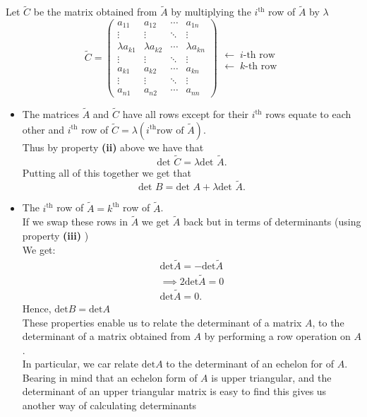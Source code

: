 \documentclass{report}
\begin{document}
\begin{enumerate}[label=(\roman*)]
{                  Let $\tilde{C}$ be the matrix obtained from $\tilde{A}$ by multiplying the $i^{\text{th}}$ row of $\tilde{A}$ by $\lambda$  
\[
\tilde{C} =
\begin{pmatrix}
  a_{11} & a_{12} & \cdots & a_{1n} \\
  \vdots & \vdots & \ddots & \vdots \\
  \lambda a_{k1} & \lambda a_{k2} & \cdots & \lambda a_{kn} \\
  \vdots & \vdots & \ddots & \vdots \\
  a_{k1} & a_{k2} & \cdots & a_{kn} \\
  \vdots & \vdots & \ddots & \vdots \\
  a_{n1} & a_{n2} & \cdots & a_{nn}
\end{pmatrix}
\!
\begin{array}{l}
 \\[1.5ex]
 \leftarrow\; \text{$i$-th row }  \\[3.5ex]
 \leftarrow\; \text{$k$-th row}
\end{array}
\]
\begin{itemize}
        \item The matrices $\tilde{A}$ and $\tilde{C}$ have all rows except for their $i^{\text{th}}$  rows equate to each other and $i^{\text{th}}$  row of $\tilde{C} = \lambda \left( i^{\text{th}} \text{row of } \tilde{A} \right) $.\\
                Thus by property \textbf{(ii)} above we have that
                \[
                \text{det } \tilde{C} = \lambda\text{det } \tilde{A} 
                .\] Putting all of this together  we get that 
                \[
                \text{det } B = \text{det } A + \lambda \text{det }  \tilde{A}
                .\] 
        \item The $i^{\text{th}}$  row of $\tilde{A}= k^{\text{th}}$ row of $\tilde{A}$.\\
                If we swap these rows in $\tilde{A}$ we get $\tilde{A} $ back but in terms of determinants (using property \textbf{(iii)} ) \\
                We get:\\
                \begin{align*}
                        \text{det} \tilde{A} = - \text{det} \tilde{A}\\
                        \implies 2 \text{det} \tilde{A}=0\\
                        \text{det} \tilde{A}=0
                .\end{align*}
                Hence,  $\text{det}  B = \text{det} A$\\
                These properties enable us to relate the determinant of a matrix $A$, to the determinant of a matrix obtained from $A$ by performing a row operation on $A$.\\
                In particular, we car relate $\text{det} A$ to the determinant of an echelon for of  $A$. Bearing in mind that an echelon form of $A$ is upper triangular, and the determinant of an upper triangular matrix is easy to find this gives us another way of calculating determinants 
\end{itemize}
          }
  \end{enumerate}
\end{document}
